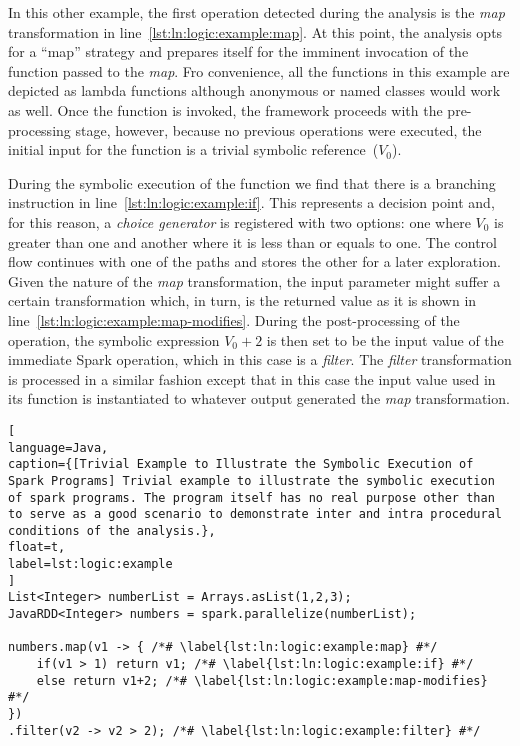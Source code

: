 In this other example, the first operation detected during the analysis is the \textit{map} transformation in line~\ref{lst:ln:logic:example:map}. At this point, the analysis opts for a ``map'' strategy and prepares itself for the imminent invocation of the function passed to the \textit{map}. Fro convenience, all the functions in this example are depicted as lambda functions although anonymous or named classes would work as well. Once the function is invoked, the framework proceeds with the pre-processing stage, however, because no previous operations were executed, the initial input for the function is a trivial symbolic reference~($V_0$).

During the symbolic execution of the function we find that there is a branching instruction in line~\ref{lst:ln:logic:example:if}. This represents a decision point and, for this reason, a \textit{choice generator} is registered with two options: one where $V_0$ is greater than one and another where it is less than or equals to one. The control flow continues with one of the paths and stores the other for a later exploration. Given the nature of the \textit{map} transformation, the input parameter might suffer a certain transformation which, in turn, is the returned value as it is shown in line~\ref{lst:ln:logic:example:map-modifies}. During the post-processing of the operation, the symbolic expression $V_0 + 2$ is then set to be the input value of the immediate Spark operation, which in this case is a \textit{filter}. The \textit{filter} transformation is processed in a similar fashion except that in this case the input value used in its function is instantiated to whatever output generated the \textit{map} transformation. 

\begin{lstlisting}[
language=Java,
caption={[Trivial Example to Illustrate the Symbolic Execution of Spark Programs] Trivial example to illustrate the symbolic execution of spark programs. The program itself has no real purpose other than to serve as a good scenario to demonstrate inter and intra procedural conditions of the analysis.},
float=t,
label=lst:logic:example
]
List<Integer> numberList = Arrays.asList(1,2,3);
JavaRDD<Integer> numbers = spark.parallelize(numberList);

numbers.map(v1 -> { /*# \label{lst:ln:logic:example:map} #*/
	if(v1 > 1) return v1; /*# \label{lst:ln:logic:example:if} #*/
	else return v1+2; /*# \label{lst:ln:logic:example:map-modifies} #*/
})
.filter(v2 -> v2 > 2); /*# \label{lst:ln:logic:example:filter} #*/
\end{lstlisting}

